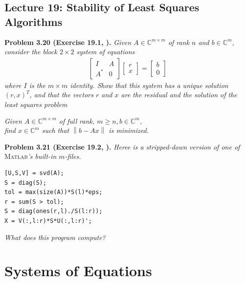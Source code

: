 \documentclass[a4paper,oneside]{book}
\numberwithin{equation}{chapter}
\begin{document}
\section{Lecture 19: Stability of Least Squares Algorithms}
\textbf{Problem 3.20 (Exercise 19.1, \cite{1}).} \textit{Given $A \in \mathbb{C}^{m\times m}$ of rank $n$ and $b\in \mathbb{C}^m$, consider the block $2\times 2$ system of equations}
\begin{align}
\left[ {\begin{array}{*{20}{c}}
I&A\\
{{A^*}}&0
\end{array}} \right]\left[ {\begin{array}{*{20}{c}}
r\\
x
\end{array}} \right] = \left[ {\begin{array}{*{20}{c}}
b\\
0
\end{array}} \right]
\end{align}
\textit{where $I$ is the $m\times m$ identity. Show that this system has a unique solution $\left(r,x\right)^T$, and that the vectors $r$ and $x$ are the residual and the solution of the least squares problem}
\begin{center}
\textit{Given $A\in \mathbb{C}^{m\times m}$ of full rank, $m\ge n,b\in \mathbb{C}^m$,\\
find $x\in \mathbb{C}^m$ such that $\left\|b-Ax\right\|$ is minimized.}
\end{center}
\textbf{Problem 3.21 (Exercise 19.2, \cite{1}).} \textit{Heree is a stripped-down version of one of}\textsc{ Matlab}\textit{'s built-in $m$-files.}
\begin{verbatim}
[U,S,V] = svd(A);
S = diag(S);
tol = max(size(A))*S(l)*eps;
r = sum(S > tol);
S = diag(ones(r,l)./S(l:r));
X = V(:,l:r)*S*U(:,l:r)';
\end{verbatim}
\textit{What does this program compute?}


\chapter{Systems of Equations}
\end{document}
